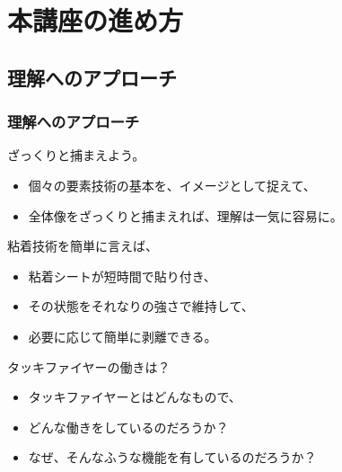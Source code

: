 \documentclass[unicode,12pt]{beamer}%
\begin{document}
\section{本講座の進め方}

\subsection{理解へのアプローチ}
\begin{frame}
	\frametitle{理解へのアプローチ}
	\vspace{-2mm}
	\begin{block}{ざっくりと捕まえよう。}
		\begin{itemize}
			\item 個々の要素技術の基本を、イメージとして捉えて、
			\item 全体像をざっくりと捕まえれば、理解は一気に容易に。
		\end{itemize}
	\end{block}
	
	\pause
	\vspace{-2mm}
	\begin{alertblock}{粘着技術を簡単に言えば、}
		\begin{itemize}
			\item 粘着シートが短時間で貼り付き、
			\item その状態をそれなりの強さで維持して、
			\item 必要に応じて簡単に剥離できる。
		\end{itemize}
	\end{alertblock}

	\pause
	\vspace{-2mm}
	\begin{exampleblock}{タッキファイヤーの働きは？}
		\begin{itemize}
			\item タッキファイヤーとはどんなもので、
			\item どんな働きをしているのだろうか？
			\item なぜ、そんなふうな機能を有しているのだろうか？
		\end{itemize}
	\end{exampleblock}

\end{frame}
\end{document}
